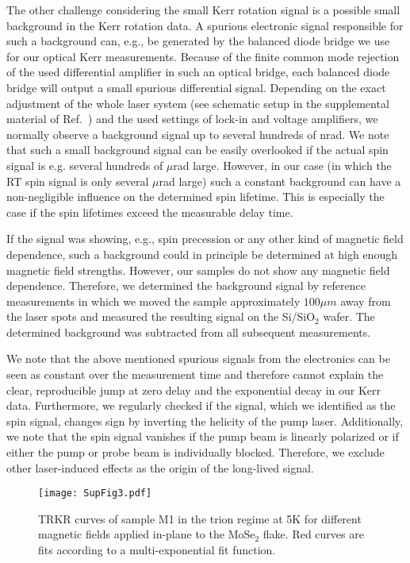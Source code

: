 \documentclass[prb,aps,superscriptaddress,reprint,floatfix]{revtex4-1}
\begin{document}
The other challenge considering the small Kerr rotation signal is a possible small background in the Kerr rotation data. A spurious electronic signal responsible for such a background can, e.g., be generated by the balanced diode bridge we use for our optical Kerr measurements.\cite{PhysRevB.56.7574} Because of the finite common mode rejection of the used differential amplifier in such an optical bridge, each balanced diode bridge will output a small spurious differential signal. Depending on the exact adjustment of the whole laser system (see schematic setup in the supplemental material of Ref.~) and the used settings of lock-in and voltage amplifiers, we normally observe a background signal up to several hundreds of nrad. We note that such a small background signal can be easily overlooked if the actual spin signal is e.g. several hundreds of $\mu$rad large. However, in our case (in which the RT spin signal is only several $\mu$rad large) such a constant background can have a non-negligible influence on the determined spin lifetime. This is especially the case if the spin lifetimes exceed the measurable delay time.

If the signal was showing, e.g., spin precession or any other kind of magnetic field dependence, such a background could in principle be determined at high enough magnetic field strengths. However, our samples do not show any magnetic field dependence. Therefore, we determined the background signal by reference measurements in which we moved the sample approximately $\unit{100}{\mu m}$ away from the laser spots and measured the resulting signal on the Si/SiO$_2$ wafer. The determined background was subtracted from all subsequent measurements.

We note that the above mentioned spurious signals from the electronics can be seen as constant over the measurement time and therefore cannot explain the clear, reproducible jump at zero delay and the exponential decay in our Kerr data. Furthermore, we regularly checked if the signal, which we identified as the spin signal, changes sign by inverting the helicity of the pump laser. Additionally, we note that the spin signal vanishes if the pump beam is linearly polarized or if either the pump or probe beam is individually blocked. Therefore, we exclude other laser-induced effects as the origin of the long-lived signal.

\begin{figure}[tb]
	\texttt{[image: SupFig3.pdf]}
\caption{TRKR curves of sample M1 in the trion regime at \unit{5}{K} for different magnetic fields applied in-plane to the MoSe$_2$ flake. Red curves are fits according to a multi-exponential fit function.}
\label{SupFig2}
\end{figure}
\end{document}

